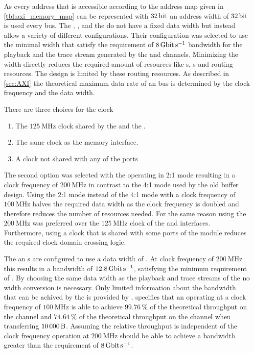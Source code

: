 As every address that is accessible according to the address map given in \autoref{tbl:axi_memory_map} can be represented with $\SI{32}{\bit}$ an address width of $\SI{32}{\bit}$ is used every \AXI{} bus.
The \AXIDMA{}, \XilinxMIG{}, \smartconnect{} and the \AXIBRAMController{} do not have a fixed \AXI{} data width but instead allow a variety of different configurations.
Their configuration was selected to use the minimal width that satisfy the requirement of $\pbExecBandwidth{}$ bandwidth for the playback and the trace stream generated by the \MMToS{} and \SToMM{} channels. Minimizing the width directly reduces the required amount of \FPGA{} resources like \LUT{}s, \FF{}s and routing resources. The \FPGA{} design is limited by these routing resources\autocite{ref:fpga_routing_limited}.
As described in \autoref{sec:AXI} the theoretical maximum data rate of an \AXI{} bus is determined by the clock frequency and the data width.

There are three choices for the clock
\begin{enumerate}
    \item The $\SI{125}{\mega\hertz}$ clock shared by the \HostARQ{} and the \pbexec{}.
    \item The same clock as the \XilinxMIG{} memory interface.
    \item A clock not shared with any of the ports
\end{enumerate}
The second option was selected with the \XilinxMIG{} operating in 2:1 mode resulting in a clock frequency of $\SI{200}{\mega\hertz}$ in contrast to the 4:1 mode used by the old buffer design. Using the 2:1 mode instead of the 4:1 mode with a clock frequency of $\SI{100}{\mega\hertz}$ halves the required data width as the clock frequency is doubled and therefore reduces the number of \FPGA{} resources needed. For the same reason using the $\SI{200}{\mega\hertz}$ was preferred over the $\SI{125}{\mega\hertz}$ clock of the \HostARQ{} and \pbexec{} interfaces.
Furthermore, using a clock that is shared with some ports of the module reduces the required clock domain crossing logic.

The \SToMM{} an \MMToS{} \AXIStream{}s are configured to use a data width of \PhyWordSize{}. At clock frequency of $\SI{200}{\mega\hertz}$ this results in a bandwidth of $\SI{12.8}{\giga\bit\per\second}$, satisfying the minimum requirement of \pbExecBandwidth{}. By choosing the same data width as the playback and trace streams of the \pbexec{} no width conversion is necessary.
Only limited information about the bandwidth that can be achived by the \AXIDMA{} is provided by \Xilinx. \Xilinx{} specifies that an \AXIDMA{} operating at a clock frequency of $\SI{100}{\mega\hertz}$ is able to achieve $\SI{99.76}{\percent}$ of the theoretical throughput on the \MMToS{} channel and $\SI{74.64}{\percent}$ of the theoretical throughput on the \SToMM{} channel when transferring $\SI{10000}{\byte}$\autocite{ref:axidma}. Assuming the relative throughput is independent of the clock frequency operation at $\SI{200}{\mega\hertz}$ should be able to achieve a bandwidth greater than the requirement of $\pbExecBandwidth{}$.

